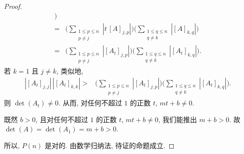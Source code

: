 \documentclass[../libro.tex]{subfiles}
\begin{document}
\begin{proof}
\begin{align*}
        \Bigg)
        \\
        = {} &
        \Bigg(
            \sum_{\substack{1 \leq p \leq n \\
            p \neq j}} {|t\, [A]_{j,p}|}
        \Bigg)
        \Bigg(
            \sum_{\substack{1 \leq q \leq n \\
            q \neq k}} {|[A]_{k,q}|}
        \Bigg)
        \\
        = {} &
        \Bigg(
            \sum_{\substack{1 \leq p \leq n \\
            p \neq j}} {|[A_t]_{j,p}|}
        \Bigg)
        \Bigg(
            \sum_{\substack{1 \leq q \leq n \\
            q \neq k}} {|[A_t]_{k,q}|}
        \Bigg).
    \end{align*}
    若 \(k = 1\) 且 \(j \neq k\),
    类似地,
    \begin{align*}
        |[A_t]_{j,j}|\,|[A_t]_{k,k}|
        > {} &
        \Bigg(
            \sum_{\substack{1 \leq p \leq n \\
            p \neq j}} {|[A_t]_{j,p}|}
        \Bigg)
        \Bigg(
            \sum_{\substack{1 \leq q \leq n \\
            q \neq k}} {|[A_t]_{k,q}|}
        \Bigg).
    \end{align*}
    则 \(\det {(A_t)} \neq 0\).
    从而,
    对任何不超过 \(1\) 的正数 \(t\),
    \(mt + b \neq 0\).

    既然 \(b > 0\),
    且对任何不超过 \(1\) 的正数 \(t\),
    \(mt + b \neq 0\),
    我们能推出 \(m + b > 0\).
    故 \(\det {(A)} = \det {(A_1)} = m + b > 0\).

    所以, \(P(n)\) 是对的.
    由数学归纳法, 待证的命题成立.
\end{proof}
\end{document}
